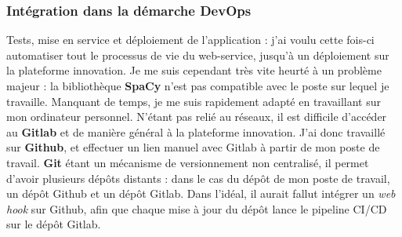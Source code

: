 \subsubsection{Intégration dans la démarche DevOps}
Tests, mise en service et déploiement de l'application : j'ai voulu cette fois-ci automatiser tout le processus de vie du web-service, jusqu'à un déploiement sur la plateforme innovation. Je me suis cependant très vite heurté à un problème majeur : la bibliothèque \textbf{SpaCy} n'est pas compatible avec le poste sur lequel je travaille. Manquant de temps, je me suis rapidement adapté en travaillant sur mon ordinateur personnel. N'étant pas relié au réseaux, il est difficile d'accéder au \textbf{Gitlab} et de manière général à la plateforme innovation. J'ai donc travaillé sur \textbf{Github}, et effectuer un lien manuel avec Gitlab à partir de mon poste de travail. \textbf{Git} étant un mécanisme de versionnement non centralisé, il permet d'avoir plusieurs dépôts distants : dans le cas du dépôt de mon poste de travail, un dépôt Github et un dépôt Gitlab. Dans l'idéal, il aurait fallut intégrer un \textit{web hook} sur Github, afin que chaque mise à jour du dépôt lance le pipeline CI/CD sur le dépôt Gitlab.
\newline

